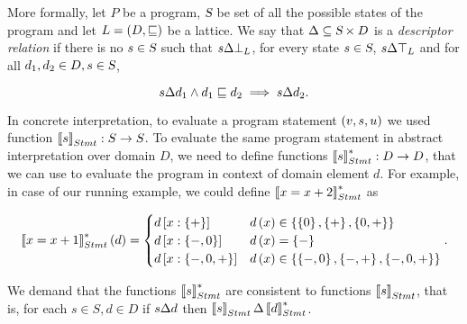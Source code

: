 \documentclass[..thesis.tex]{subfiles}
\begin{document}


More formally, let $P$ be a program, $\textsl{S}$ be set of all the possible states of the program and let $L = \left( D, \sqsubseteq \right)$ be a lattice. We say that $\Delta \subseteq \textsl{S} \times D$ is a \textit{descriptor relation} if there is no $s \in \textsl{S}$ such that $s \Delta \bot_L$, for every state $s \in \textsl{S}$, $s \Delta \top_L$ and for all $d_1,d_2 \in D, s \in \textsl{S}$,

\begin{equation*}
s \Delta d_1 \land d_1 \sqsubseteq d_2 \implies s \Delta d_2 \text{.}
\end{equation*}

In concrete interpretation, to evaluate a program statement $\left( v, s, u \right)$ we used function $\left\llbracket s \right\rrbracket_{Stmt} : S \to S$. To evaluate the same program statement in abstract interpretation over domain $D$, we need to define functions $\left\llbracket s \right\rrbracket_{Stmt}^{*} : D \to D$, that we can use to evaluate the program in context of domain element $d$. For example, in case of our running example, we could define $\left\llbracket x =  x + 2 \right\rrbracket_{Stmt}^{*}$ as

\begin{equation*}
\left\llbracket x = x + 1 \right\rrbracket_{Stmt}^{*} \left( d \right) =
\begin{cases}
d \left[ x : \left\lbrace + \right\rbrace \right] & d \left( x \right)  \in \left\lbrace  \left\lbrace 0  \right\rbrace, \left\lbrace + \right\rbrace, \left\lbrace 0, + \right\rbrace \right\rbrace  \\
d \left[ x : \left\lbrace -, 0 \right\rbrace \right] & d \left( x \right) =  \left\lbrace - \right\rbrace \\
d \left[ x : \left\lbrace -, 0, + \right\rbrace \right] & d \left( x \right) \in \left\lbrace \left\lbrace -,0 \right\rbrace, \left\lbrace -, + \right\rbrace, \left\lbrace -, 0, + \right\rbrace \right\rbrace \\
\end{cases}
\text{.}      
\end{equation*}

We demand that the functions $\left\llbracket s \right\rrbracket_{Stmt}^{*}$ are consistent to functions $\left\llbracket s \right\rrbracket_{Stmt}$, that is, for each $s \in S, d \in D$ if $s \Delta d$ then $ \left\llbracket s \right\rrbracket_{Stmt} \Delta \left\llbracket d \right\rrbracket_{Stmt}^{*}$.
\end{document}
